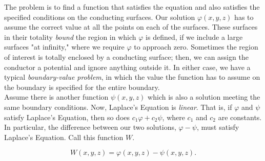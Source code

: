 \documentclass[svgnames]{article}
\begin{document}
The problem is to find a function that satisfies the equation and also
satisfies the specified conditions on the conducting surfaces. Our solution
$\varphi (x,y,z)$ has to assume the correct value at all the points on each of
the surfaces. These surfaces in their totality \textit{bound} the region in
which $\varphi$ is defined, if we include a large surfaces "at infinity," where
we require $\varphi$ to approach zero. Sometimes the region of interest is
totally enclosed by a conducting surface; then, we can assign the conductor
a potential and ignore anything outside it. In either case, we have a typical
\textit{boundary-value problem}, in which the value the function has to assume
on the boundary is specified for the entire boundary.\\

Assume there is another function $\psi(x,y,z)$ which is also a solution
meeting the same boundary conditions. Now, Laplace's Equation is
\textit{linear}. That is, if $\varphi$ and $\psi$ satisfy Laplace's
Equation, then so does $c_1\varphi + c_2\psi$, where $c_1$ and $c_2$ are
constants. In particular, the difference between our two solutions, $\varphi
- \psi$, must satisfy Laplace's Equation. Call this function $W$. 

\[
W(x,y,z) = \varphi(x,y,z) - \psi(x,y,z)
.\] 

 
\end{document}
